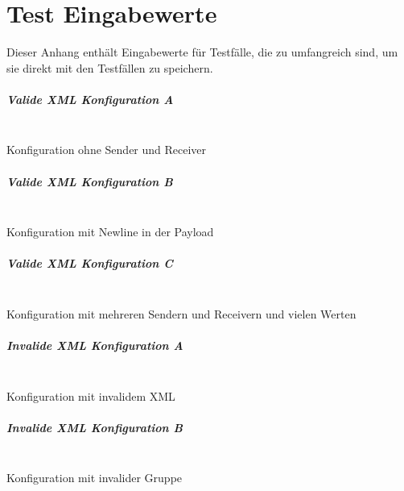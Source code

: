 \chapter{Test Eingabewerte}

Dieser Anhang enthält Eingabewerte für Testfälle, die zu umfangreich sind, um sie direkt mit den Testfällen zu speichern.\\

\paragraph{Valide XML Konfiguration A}
~\\Konfiguration ohne Sender und Receiver\\

\newpage 

\paragraph{Valide XML Konfiguration B}
~\\Konfiguration mit Newline in der Payload\\

\newpage 

\paragraph{Valide XML Konfiguration C}
~\\Konfiguration mit mehreren Sendern und Receivern und vielen Werten\\

\newpage 


\paragraph{Invalide XML Konfiguration A}
~\\Konfiguration mit invalidem XML\\

\newpage 

\paragraph{Invalide XML Konfiguration B}
~\\Konfiguration mit invalider Gruppe\\

\newpage 

